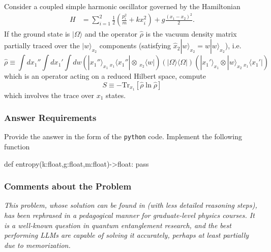 Consider a coupled simple harmonic oscillator governed by the Hamiltonian
\begin{align}
H & =\sum_{i=1}^{2}\frac{1}{2}\left(\frac{p_{i}^{2}}{m}+kx_{i}^{2}\right)+g\frac{(x_{1}-x_{2})^{2}}{2}.
\end{align}
If the ground state is $|\Omega\rangle$ and the operator $\hat{\rho}$
is the vacuum density matrix partially traced over the $|w\rangle_{x_{2}}$
components (satisfying $\hat{x}_{2}|w\rangle_{x_{2}}=w|w\rangle_{x_{2}}$),
i.e.
\begin{equation}
\hat{\rho}\equiv\int dx_{1}''\int dx_{1}'\int dw\left(|x_{1}''\rangle_{x_{1}}\,_{x_{1}}\langle x_{1}''|\otimes\,_{x_{2}}\langle w|\right)\left(|\Omega\rangle\langle\Omega|\right)\left(|x_{1}'\rangle_{x_{1}}\otimes|w\rangle_{x_{2}}\,_{x_{1}}\langle x_{1}'|\right)
\end{equation}
which is an operator acting on a reduced Hilbert space, compute 
\begin{equation}
S\equiv-\mathrm{Tr}_{x_{1}}\left[\hat{\rho}\ln\hat{\rho}\right]
\end{equation}
which involves the trace over $x_{1}$ states.

\subsubsection*{Answer Requirements}
Provide the answer in the form of the \texttt{python} code. Implement the following function 
\begin{python}
def entropy(k:float,g:float,m:float)->float:
    pass
\end{python}


\subsubsection*{Comments about the Problem}

\textit{This problem, whose solution can be found in \cite{Srednicki:1993im} (with less detailed reasoning steps), has been rephrased in a pedagogical manner for graduate-level physics courses. It is a well-known question in quantum entanglement research, and the best performing LLMs are capable of solving it accurately, perhaps at least partially due to memorization.}



